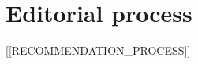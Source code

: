 \documentclass[a4paper]{article}
\begin{document}
\beginingpreprint

\section*{\centering Editorial process}

[[RECOMMENDATION_PROCESS]]
\end{document}
